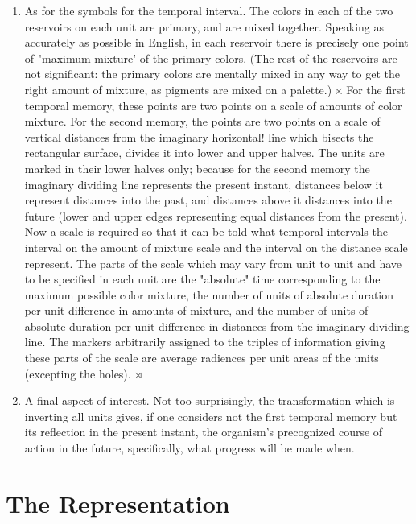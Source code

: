 \documentclass[10pt,twoside,draft]{memoir}
\begin{document}
{{\begin{enumerate}
\item As for the symbols for the temporal interval. The colors in each of 
the two reservoirs on each unit are primary, and are mixed together. 
Speaking as accurately as possible in English, in each reservoir there is 
precisely one point of "maximum mixture' of the primary colors. (The rest 
of the reservoirs are not significant: the primary colors are mentally mixed in 
any way to get the right amount of mixture, as pigments are mixed on a 
palette.) $\ltimes$ For the first temporal memory, these points are two points on a 
scale of amounts of color mixture. For the second memory, the points are 
two points on a scale of vertical distances from the imaginary horizontal! line 
which bisects the rectangular surface, divides it into lower and upper halves. 
The units are marked in their lower halves only; because for the second 
memory the imaginary dividing line represents the present instant, distances 
below it represent distances into the past, and distances above it distances 
into the future (lower and upper edges representing equal distances from the 
present). Now a scale is required so that it can be told what temporal 
intervals the interval on the amount of mixture scale and the interval on the 
distance scale represent. The parts of the scale which may vary from unit to 
unit and have to be specified in each unit are the "absolute" time 
corresponding to the maximum possible color mixture, the number of units 
of absolute duration per unit difference in amounts of mixture, and the 
number of units of absolute duration per unit difference in distances from 
the imaginary dividing line. The markers arbitrarily assigned to the triples of 
information giving these parts of the scale are average radiences per unit 
areas of the units (excepting the holes). $\rtimes$

\item A final aspect of interest. Not too surprisingly, the transformation 
which is inverting all units gives, if one considers not the first temporal 
memory but its reflection in the present instant, the organism's precognized 
course of action in the future, specifically, what progress will be made when. 
\end{enumerate}


\section*{The Representation}

}}
\end{document}

